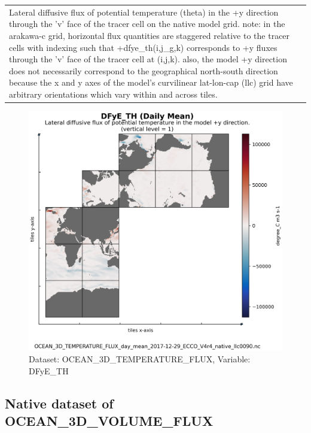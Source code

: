 \begin{longtable}{|m{}|m{}|m{}|m{}|}
\rowcolor{lightgray} \multicolumn{4}{|c|}{\textbf{Comments}} \\ \hline
\multicolumn{4}{|p{1\textwidth}|}{\footnotesize{{Lateral diffusive flux of potential temperature (theta) in the +y direction through the 'v' face of the tracer cell on the native model grid. note: in the arakawa-c grid, horizontal flux quantities are staggered relative to the tracer cells with indexing such that +dfye\_th(i,j\_g,k) corresponds to +y fluxes through the 'v' face of the tracer cell at (i,j,k). also, the model +y direction does not necessarily correspond to the geographical north-south direction because the x and y axes of the model's curvilinear lat-lon-cap (llc) grid have arbitrary orientations which vary within and across tiles.}}} \\ \hline
\end{longtable}

\begin{figure}[H]
\centering
\includegraphics[scale=0.55]{../images/plots/native_plots/Ocean_Three-Dimensional_Potential_Temperature_Fluxes/DFyE_TH.png}
\caption{Dataset: OCEAN\_3D\_TEMPERATURE\_FLUX, Variable: DFyE\_TH}
\label{tab:table-OCEAN_3D_TEMPERATURE_FLUX_DFyE_TH-Plot}
\end{figure}
\newpage
\subsection{Native dataset of OCEAN\_3D\_VOLUME\_FLUX}
\newp
